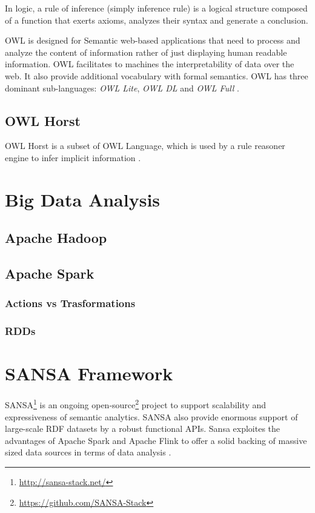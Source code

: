 \begin{definition}
In logic, a rule of inference (simply inference rule) is a logical structure composed of a function that exerts axioms, analyzes their syntax and generate a conclusion.
\end{definition}

\begin{definition}[OWL]
\ac{OWL} is designed for Semantic web-based applications that need to process and analyze the content of information rather of just displaying human readable information. OWL facilitates to machines the interpretability of data over the web. It also provide additional vocabulary with formal semantics. OWL has three dominant sub-languages: \textit{OWL Lite}, \textit{OWL DL} and \textit{OWL Full} \cite{mcguinness2004owl}.
\end{definition}
\subsection{OWL Horst}
OWL Horst is a subset of OWL Language, which is used by a rule reasoner engine to infer implicit information \cite{liu2016rors}.

\section{Big Data Analysis}
\subsection{Apache Hadoop}
\subsection{Apache Spark}
\subsubsection{Actions vs Trasformations}
\subsubsection{RDDs}
\section{SANSA Framework}
\ac{SANSA}\footnote{\url{http://sansa-stack.net/}} is an ongoing open-source\footnote{\url{https://github.com/SANSA-Stack}}  project to support scalability and expressiveness of semantic analytics. SANSA also provide enormous support of large-scale RDF datasets by a robust functional APIs. Sansa exploites the advantages of Apache Spark and Apache Flink to offer a solid backing of massive sized data sources in terms of data analysis \cite{lehmann2017distributed}.

